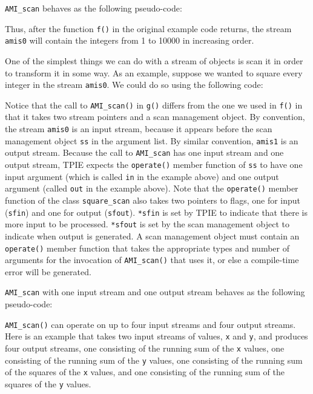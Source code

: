 \lstinline|AMI_scan| behaves as the following pseudo-code:



Thus, after the function \lstinline|f()| in the original
example code returns, the stream \lstinline|amis0| will contain
the integers from 1 to 10000 in increasing order.

One of the simplest things we can do with a stream of
objects is scan it in order to transform it in some way.  As
an example, suppose we wanted to square every integer in the
stream \lstinline|amis0|.  We could do so using the following
code:



Notice that the call to \lstinline|AMI_scan()| in \lstinline|g()|
differs from the one we used in \lstinline|f()| in that it
takes two stream pointers and a scan management object.  By
convention, the stream \lstinline|amis0| is an input stream,
because it appears before the scan management object
\lstinline|ss| in the argument list.  By similar convention,
\lstinline|amis1| is an output stream.  Because the call to
\lstinline|AMI_scan| has one input stream and one output
stream, TPIE expects the \lstinline|operate()| member function
of \lstinline|ss| to have one input argument (which is called
\lstinline|in| in the example above) and one output argument
(called \lstinline|out| in the example above).  Note that the
\lstinline|operate()| member function of the class
\lstinline|square_scan| also takes two pointers to flags, one
for input (\lstinline|sfin|) and one for output
(\lstinline|sfout|).  \lstinline|*sfin| is set by TPIE to indicate
that there is more input to be processed.  \lstinline|*sfout|
is set by the scan management object to indicate when output
is generated.  A scan management object must contain an
\lstinline|operate()| member function that takes the
appropriate types and number of arguments for the invocation
of \lstinline|AMI_scan()| that uses it, or else a compile-time
error will be generated.

\lstinline|AMI_scan| with one input stream and one output stream
behaves as the following pseudo-code:



\lstinline|AMI_scan()| can operate on up to four input streams
and four output streams.  Here is an example that takes two
input streams of values, \lstinline|x| and \lstinline|y|, and
produces four output streams, one consisting of the running
sum of the \lstinline|x| values, one consisting of the running
sum of the \lstinline|y| values, one consisting of the running
sum of the squares of the \lstinline|x| values, and one
consisting of the running sum of the squares of the
\lstinline|y| values.

